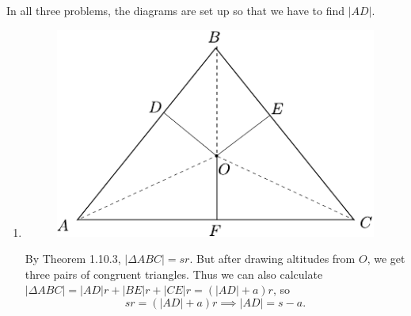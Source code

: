 \documentclass[twoside,10pt]{article}
\begin{document}
In all three problems, the diagrams are set up so that we have to find $|AD|$.
\begin{enumerate}
	\item
		\begin{figure}[H]
			\centering
			\includegraphics[scale=1]{fig/81a.pdf}
		\end{figure}
		By Theorem 1.10.3, $|\Delta ABC| = sr$. But after drawing altitudes from $O$, we get three pairs of congruent triangles. Thus we can also calculate $|\Delta ABC| = |AD|r+|BE|r+|CE|r = (|AD|+a)r$, so
		\[
			sr = (|AD|+a)r \implies |AD| = s-a.
		\] 


\end{enumerate}
\end{document}
